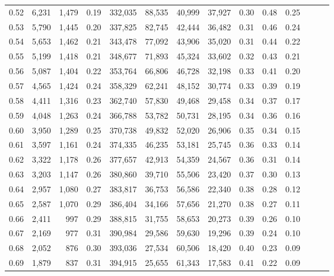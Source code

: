 \begin{tabular}{rrrrrrrrrrrrrr}
0.52 &   6,231 &  1,479 &  0.19 &  332,035 &   88,535 &  40,999 &  37,927 &  0.30 &  0.48 &      0.25 \\
0.53 &   5,790 &  1,445 &  0.20 &  337,825 &   82,745 &  42,444 &  36,482 &  0.31 &  0.46 &      0.24 \\
0.54 &   5,653 &  1,462 &  0.21 &  343,478 &   77,092 &  43,906 &  35,020 &  0.31 &  0.44 &      0.22 \\
0.55 &   5,199 &  1,418 &  0.21 &  348,677 &   71,893 &  45,324 &  33,602 &  0.32 &  0.43 &      0.21 \\
0.56 &   5,087 &  1,404 &  0.22 &  353,764 &   66,806 &  46,728 &  32,198 &  0.33 &  0.41 &      0.20 \\
0.57 &   4,565 &  1,424 &  0.24 &  358,329 &   62,241 &  48,152 &  30,774 &  0.33 &  0.39 &      0.19 \\
0.58 &   4,411 &  1,316 &  0.23 &  362,740 &   57,830 &  49,468 &  29,458 &  0.34 &  0.37 &      0.17 \\
0.59 &   4,048 &  1,263 &  0.24 &  366,788 &   53,782 &  50,731 &  28,195 &  0.34 &  0.36 &      0.16 \\
0.60 &   3,950 &  1,289 &  0.25 &  370,738 &   49,832 &  52,020 &  26,906 &  0.35 &  0.34 &      0.15 \\
0.61 &   3,597 &  1,161 &  0.24 &  374,335 &   46,235 &  53,181 &  25,745 &  0.36 &  0.33 &      0.14 \\
0.62 &   3,322 &  1,178 &  0.26 &  377,657 &   42,913 &  54,359 &  24,567 &  0.36 &  0.31 &      0.14 \\
0.63 &   3,203 &  1,147 &  0.26 &  380,860 &   39,710 &  55,506 &  23,420 &  0.37 &  0.30 &      0.13 \\
0.64 &   2,957 &  1,080 &  0.27 &  383,817 &   36,753 &  56,586 &  22,340 &  0.38 &  0.28 &      0.12 \\
0.65 &   2,587 &  1,070 &  0.29 &  386,404 &   34,166 &  57,656 &  21,270 &  0.38 &  0.27 &      0.11 \\
0.66 &   2,411 &    997 &  0.29 &  388,815 &   31,755 &  58,653 &  20,273 &  0.39 &  0.26 &      0.10 \\
0.67 &   2,169 &    977 &  0.31 &  390,984 &   29,586 &  59,630 &  19,296 &  0.39 &  0.24 &      0.10 \\
0.68 &   2,052 &    876 &  0.30 &  393,036 &   27,534 &  60,506 &  18,420 &  0.40 &  0.23 &      0.09 \\
0.69 &   1,879 &    837 &  0.31 &  394,915 &   25,655 &  61,343 &  17,583 &  0.41 &  0.22 &      0.09 \\

\end{tabular}
